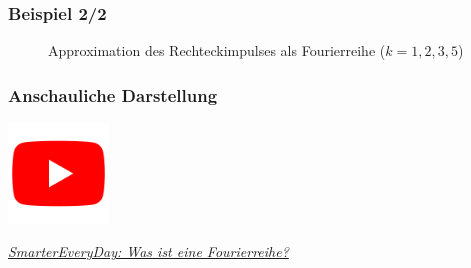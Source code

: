 \begin{frame}
\frametitle{Beispiel 2/2}
\begin{figure}

\caption{Approximation des Rechteckimpulses als Fourierreihe ($k=1,2,3,5$)}
\end{figure}
\end{frame}


\begin{frame}
\frametitle{Anschauliche Darstellung}
\vfill
\begin{center}
\includegraphics[width=0.2\textwidth]{fig_img/youtube.png}  

\href{https://www.youtube.com/watch?v=ds0cmAV-Yek}{\textsl{SmarterEveryDay: Was ist eine Fourierreihe?}}
\end{center}  
\vfill
\end{frame}
